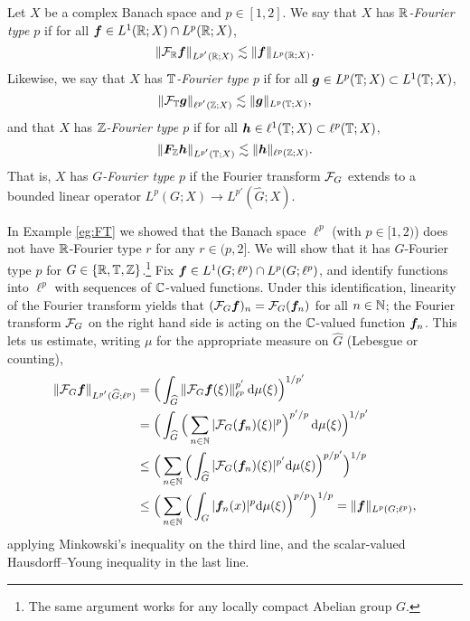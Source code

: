 \begin{defn}
  Let $X$ be a complex Banach space and $p \in [1,2]$.
  We say that $X$ has \emph{$\mathbb{R}$-Fourier type $p$} if for all $\bm{f} \in L^1(\mathbb{R};X) \cap L^p(\mathbb{R};X)$,
  \begin{equation*}
    \|\mathcal{F}_{\mathbb{R}} \bm{f}\|_{L^{p'}(\mathbb{R};X)} \lesssim \|\bm{f}\|_{L^{p}(\mathbb{R};X)}.
  \end{equation*}
  Likewise, we say that $X$ has \emph{$\mathbb{T}$-Fourier type $p$} if for all $\bm{g} \in L^p(\mathbb{T};X) \subset L^1(\mathbb{T};X)$,
  \begin{equation*}
    \|\mathcal{F}_{\mathbb{T}} \bm{g}\|_{\ell^{p'}(\mathbb{Z};X)} \lesssim \|\bm{g}\|_{L^{p}(\mathbb{T};X)},
  \end{equation*}
  and that $X$ has \emph{$\mathbb{Z}$-Fourier type $p$} if for all $\bm{h} \in \ell^{1}(\mathbb{T};X) \subset \ell^{p}(\mathbb{T};X)$,
  \begin{equation*}
    \|\bm{F}_{\mathbb{Z}} \bm{h}\|_{L^{p'}(\mathbb{T};X)} \lesssim \|\bm{h}\|_{\ell^{p}(\mathbb{Z};X)}.
  \end{equation*}
  That is, $X$ has \emph{$G$-Fourier type $p$} if the Fourier transform $\mathcal{F}_{G}$ extends to a bounded linear operator $L^p(G;X) \to L^{p'}(\widehat{G};X)$.
\end{defn}

\begin{example}
  In Example \ref{eg:FT} we showed that the Banach space $\ell^p$ (with $p \in [1,2)$) does not have $\mathbb{R}$-Fourier type $r$ for any $r \in (p,2]$.
  We will show that it has $G$-Fourier type $p$ for $G \in \{\mathbb{R},\mathbb{T},\mathbb{Z}\}$.\footnote{The same argument works for any locally compact Abelian group $G$.}
  Fix $\bm{f} \in L^1(G;\ell^{p}) \cap L^p(G;\ell^{p})$, and identify functions into $\ell^{p}$ with sequences of $\mathbb{C}$-valued functions.
  Under this identification, linearity of the Fourier transform yields that $(\mathcal{F}_{G}\bm{f})_{n} = \mathcal{F}_{G} (\bm{f}_{n})$ for all $n \in \mathbb{N}$; the Fourier transform $\mathcal{F}_{G}$ on the right hand side is acting on the $\mathbb{C}$-valued function $\bm{f}_{n}$.
  This lets us estimate, writing $\mu$ for the appropriate measure on $\widehat{G}$ (Lebesgue or counting),
  \begin{equation*}
    \begin{aligned}
      \|\mathcal{F}_{G} \bm{f}\|_{L^{p'}(\widehat{G};\ell^{p})}
      &= \Big( \int_{\widehat{G}} \|\mathcal{F}_{G} \bm{f}(\xi)\|_{\ell^{p}}^{p'} \, \mathrm{d}\mu(\xi) \Big)^{1/p'} \\
      &= \Big( \int_{\widehat{G}} \Big( \sum_{n \in \mathbb{N}} |\mathcal{F}_{G} (\bm{f}_{n})(\xi)|^{p}  \Big)^{p'/p} \, \mathrm{d}\mu(\xi) \Big)^{1/p'} \\
      &\leq \Big( \sum_{n \in \mathbb{N}}   \Big( \int_{\widehat{G}} |\mathcal{F}_{G} (\bm{f}_{n})(\xi)|^{p'} \mathrm{d}\mu(\xi)  \Big)^{p/p'} \Big)^{1/p} \\
      &\leq \Big( \sum_{n \in \mathbb{N}}  \Big( \int_{G} |\bm{f}_{n}(x)|^{p} \mathrm{d}\mu(\xi) \Big)^{p/p} \Big)^{1/p} = \|\bm{f}\|_{L^{p}(G;\ell^{p})},
  \end{aligned}
  \end{equation*}
  applying Minkowski's inequality on the third line, and the scalar-valued Hausdorff--Young inequality in the last line.
\end{example}

